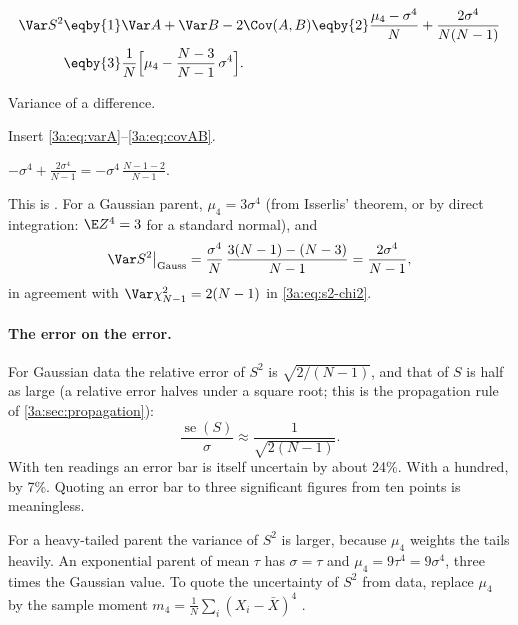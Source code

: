 \begin{align}
  \Var S^2
  &\eqby{1} \Var A+\Var B-2\Cov(A,B)
   \eqby{2} \frac{\mu_4-\sigma^4}{N}+\frac{2\sigma^4}{N(N-1)} \nonumber\\
  &\eqby{3} \frac1N\Bigl[\mu_4-\frac{N-3}{N-1}\,\sigma^4\Bigr] .
  \label{3a:eq:var-s2}
\end{align}
\begin{explain}
  \item Variance of a difference.
  \item Insert \eqref{3a:eq:varA}--\eqref{3a:eq:covAB}.
  \item $-\sigma^4+\frac{2\sigma^4}{N-1}=-\sigma^4\,\frac{N-1-2}{N-1}$.
\end{explain}
This is . For a Gaussian parent, $\mu_4=3\sigma^4$ (from
Isserlis' theorem, or by direct integration: $\E Z^4=3$ for a standard
normal), and
\begin{equation}
  \Var S^2\big|_{\text{Gauss}}
  =\frac{\sigma^4}{N}\,\frac{3(N-1)-(N-3)}{N-1}=\frac{2\sigma^4}{N-1},
  \label{3a:eq:var-s2-gauss}
\end{equation}
in agreement with $\Var\chi^2_{N-1}=2(N-1)$ in \eqref{3a:eq:s2-chi2}.

\paragraph{The error on the error.}
For Gaussian data the relative error of $S^2$ is $\sqrt{2/(N-1)}$, and that
of $S$ is half as large (a relative error halves under a square root; this
is the propagation rule of \cref{3a:sec:propagation}):
\begin{equation}
  \frac{\operatorname{se}(S)}{\sigma}\approx\frac{1}{\sqrt{2(N-1)}} .
  \label{3a:eq:error-on-error}
\end{equation}
With ten readings an error bar is itself uncertain by about 24\%. With a
hundred, by 7\%. Quoting an error bar to three significant figures from ten
points is meaningless.

For a heavy-tailed parent the variance of $S^2$ is larger, because $\mu_4$
weights the tails heavily. An exponential parent of mean $\tau$ has
$\sigma=\tau$ and $\mu_4=9\tau^4=9\sigma^4$, three times the Gaussian value.
To quote the
uncertainty of $S^2$ from data, replace $\mu_4$ by the sample moment
$m_4=\frac1N\sum_i(X_i-\bar X)^4$ .

